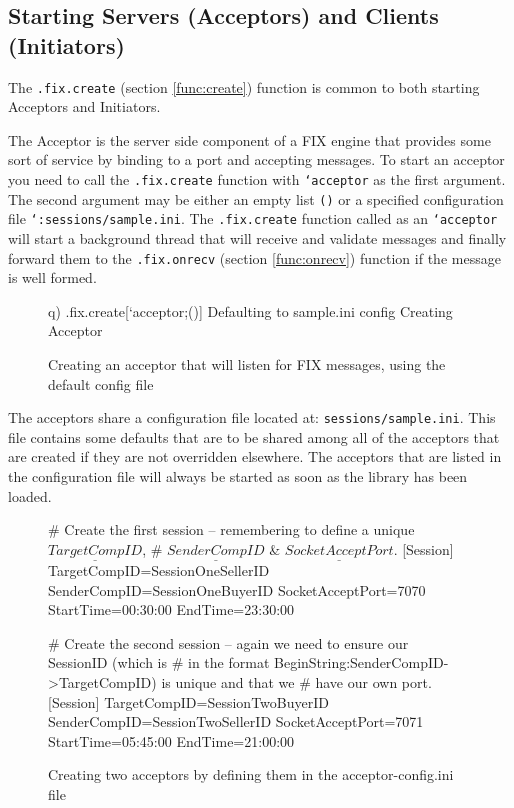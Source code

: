 \subsection{Starting Servers (Acceptors) and Clients (Initiators)}

The \texttt{.fix.create} (section \ref{func:create}) function is common to both starting Acceptors and Initiators. 

The Acceptor is the server side component of a FIX engine that provides some sort of service by binding to a port and accepting messages. To start an acceptor you need to
call the \texttt{.fix.create} function with \texttt{`acceptor} as the first argument. The second argument may be either an empty list \texttt{()} or a specified configuration file \texttt{`:sessions/sample.ini}. The \texttt{.fix.create} function called as an \texttt{`acceptor} will start a background thread that will receive and validate messages and finally forward them to the \texttt{.fix.onrecv} (section \ref{func:onrecv}) function if the message is well formed.

\begin{figure}[H]
\begin{qcode}
q) .fix.create[`acceptor;()]
Defaulting to sample.ini config
Creating Acceptor
\end{qcode}
\caption{Creating an acceptor that will listen for FIX messages, using the default config file}
\end{figure}

The acceptors share a configuration file located at: \verb|sessions/sample.ini|. This file contains some defaults that are to be shared among all of the acceptors that are created if they are not overridden elsewhere. The acceptors that are listed in the configuration file will always be started as soon as the library has been loaded.

\begin{figure}[H]
\begin{inicode}
# Create the first session -- remembering to define a unique $\underline{TargetCompID}$,
# $\underline{SenderCompID}$ & $\underline{SocketAcceptPort}$.
[Session]
TargetCompID=SessionOneSellerID
SenderCompID=SessionOneBuyerID
SocketAcceptPort=7070
StartTime=00:30:00
EndTime=23:30:00

# Create the second session -- again we need to ensure our SessionID (which is
# in the format BeginString:SenderCompID->TargetCompID) is unique and that we
# have our own port.
[Session]
TargetCompID=SessionTwoBuyerID
SenderCompID=SessionTwoSellerID
SocketAcceptPort=7071
StartTime=05:45:00
EndTime=21:00:00
\end{inicode}
\caption{Creating two acceptors by defining them in the acceptor-config.ini file}
\end{figure}


